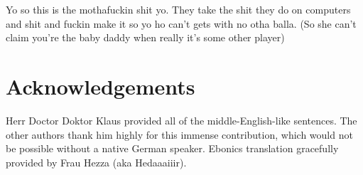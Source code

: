 \documentclass[10pt,twocolumn,letterpaper]{article}
\begin{document}
Yo so this is the mothafuckin shit yo. They take the shit they do on computers and shit and fuckin make it so yo ho can't gets with no otha balla. (So she can't claim you're the baby daddy when really it's some other player)

\section{Acknowledgements}
Herr Doctor Doktor Klaus provided all of the middle-English-like sentences. The other authors thank him highly for this immense contribution, which would not be possible without a native German speaker. Ebonics translation gracefully provided by Frau Hezza (aka Hedaaaiiir).
\end{document}
